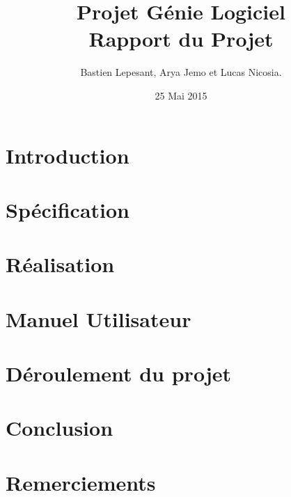 \documentclass[a4paper,11 pt,fleqn]{report}
\title{\textbf{Projet Génie Logiciel} \vspace{3\baselineskip}\\
  Rapport du Projet\vspace{2\baselineskip}}
\author{Bastien Lepesant, Arya Jemo et Lucas Nicosia.}
\date{25 Mai 2015}
\begin{document}
  \def\chaptername{Partie}

  \sectionfont{\large}

  \titleformat{\chapter}[display]{\normalfont\huge\bfseries}{}{20pt}{\huge}

  \titlespacing*{\chapter}{0pt}{-50pt}{10pt}
 
  \maketitle
  \tableofcontents
 
  \chapter{Introduction}
    
  
  \chapter{Spécification}
    
  
  \chapter{Réalisation}
    
  
  \chapter{Manuel Utilisateur}
    

  \chapter{Déroulement du projet}
    
  
  \chapter{Conclusion}
    
    
    \chapter{Remerciements}

\end{document}
